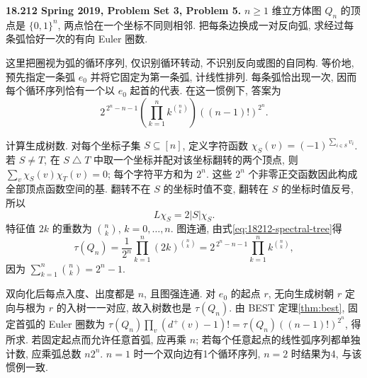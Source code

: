 \begin{exercise}\label{mit:18212-pset3-q5}
\textbf{18.212 Spring 2019, Problem Set 3, Problem 5.}
$n\ge1$ 维立方体图 $Q_n$ 的顶点是 $\{0,1\}^n$, 两点恰在一个坐标不同则相邻. 把每条边换成一对反向弧, 求经过每条弧恰好一次的有向 Euler 圈数.
\end{exercise}
\begin{solution}
这里把圈视为弧的循环序列, 仅识别循环转动, 不识别反向或图的自同构. 等价地, 预先指定一条弧 $e_0$ 并将它固定为第一条弧, 计线性排列. 每条弧恰出现一次, 因而每个循环序列恰有一个以 $e_0$ 起首的代表. 在这一惯例下, 答案为
\[
 2^{\,2^n-n-1}
 \left(\prod_{k=1}^n k^{\binom nk}\right)
 ((n-1)!)^{2^n}.
\]

计算生成树数. 对每个坐标子集 $S\subseteq[n]$, 定义字符函数
$\chi_S(v)=(-1)^{\sum_{i\in S}v_i}$. 若 $S\ne T$, 在 $S\mathbin\triangle T$ 中取一个坐标并配对该坐标翻转的两个顶点, 则 $\sum_v\chi_S(v)\chi_T(v)=0$; 每个字符平方和为 $2^n$. 这些 $2^n$ 个非零正交函数因此构成全部顶点函数空间的基. 翻转不在 $S$ 的坐标时值不变, 翻转在 $S$ 的坐标时值反号, 所以
\[
 L\chi_S=2|S|\chi_S.
\]
特征值 $2k$ 的重数为 $\binom nk$, $k=0,\ldots,n$. 图连通, 由式\eqref{eq:18212-spectral-tree}得
\[
 \tau(Q_n)=\frac1{2^n}\prod_{k=1}^n(2k)^{\binom nk}
      =2^{\,2^n-n-1}\prod_{k=1}^n k^{\binom nk},
\]
因为 $\sum_{k=1}^n\binom nk=2^n-1$.

双向化后每点入度、出度都是 $n$, 且图强连通. 对 $e_0$ 的起点 $r$, 无向生成树朝 $r$ 定向与根为 $r$ 的入树一一对应, 故入树数也是 $\tau(Q_n)$. 由 BEST 定理\ref{thm:best}, 固定首弧的 Euler 圈数为
$\tau(Q_n)\prod_v(d^+(v)-1)!=\tau(Q_n)((n-1)!)^{2^n}$, 得所求. 若固定起点而允许任意首弧, 应再乘 $n$; 若每个任意起点的线性弧序列都单独计数, 应乘弧总数 $n2^n$. $n=1$ 时一个双向边有1个循环序列, $n=2$ 时结果为4, 与该惯例一致.
\end{solution}

